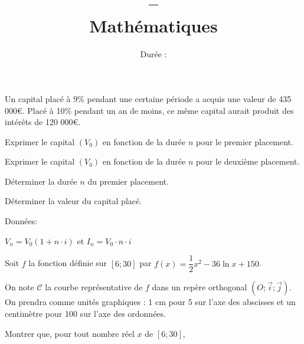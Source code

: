 \documentclass[a4paper,12pt]{scrartcl}
\date{}
\title{\textbf{\typedevoir{} -- \classe{}\writecorrword{} \\
Mathématiques}}
\author{Durée : \duree{}}
\begin{document}
\maketitle


Un capital placé à 9\% pendant une certaine période a acquis une valeur de 435 000\euro{}. Placé à 10\% pendant un an de moins, ce même capital aurait produit des intérêts de 120 000\euro{}.

\question{}
Exprimer le capital $(V_0)$ en fonction de la durée $n$ pour le premier placement.


\question{}
Exprimer le capital $(V_0)$ en fonction de la durée $n$ pour le deuxième placement.


\question{}
Déterminer la durée $n$ du premier placement.


\question{}
Déterminer la valeur du capital placé.


Données: 

$V_n = V_0(1+n \cdot i)$ et $I_n = V_0 \cdot n \cdot i$ 


Soit $f$ la fonction définie sur $[6; 30]$ par $f(x) = \dfrac{1}{2}x^2 - 36 \ln x + 150$.  

On note $\mathcal{C}$ la courbe représentative de $f$ dans un repère orthogonal $\left(O ; \overrightarrow{i} ; \overrightarrow{j} \right)$. On prendra comme unités graphiques : 1 cm pour 5 sur l'axe des abscisses et un centimètre pour 100 sur l'axe des ordonnées.
 
 
 \subquestion{}
 Montrer que, pour tout nombre réel $x$ de $[6;30]$,
 
\end{document}

